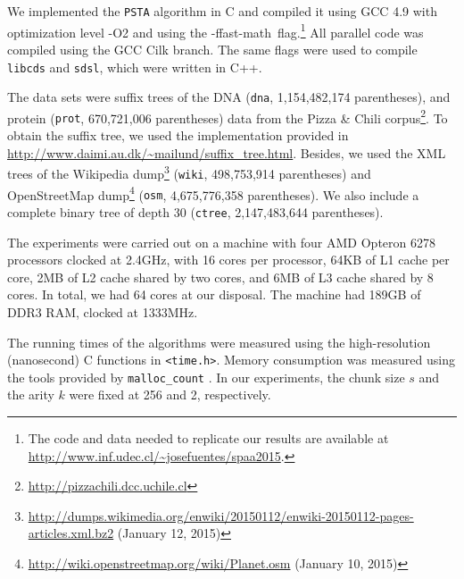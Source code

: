 We implemented the {\tt PSTA} algorithm in C and compiled it using GCC 4.9 with
optimization level -O2 and using the \mbox{-ffast-math flag}.\footnote{The code
  and data needed to replicate our results are available at
  \url{http://www.inf.udec.cl/~josefuentes/spaa2015}.}
All parallel code was compiled using the GCC Cilk branch.
The same flags were used to compile {\tt libcds} and {\tt sdsl}, which were
written in C++.

The data sets were suffix trees of the DNA ({\tt dna}, 1,154,482,174 parentheses), and
protein ({\tt prot}, 670,721,006 parentheses) data from the Pizza \& Chili
corpus\footnote{\url{http://pizzachili.dcc.uchile.cl}}. To obtain the suffix tree,
we used the implementation provided in \url{http://www.daimi.au.dk/~mailund/suffix_tree.html}.
Besides, we used the XML trees of the Wikipedia dump\footnote{\url{http://dumps.wikimedia.org/enwiki/20150112/enwiki-20150112-pages-articles.xml.bz2} (January 12, 2015)} ({\tt wiki}, 498,753,914 parentheses) and OpenStreetMap dump\footnote{\url{http://wiki.openstreetmap.org/wiki/Planet.osm} (January 10, 2015)} ({\tt osm}, 4,675,776,358 parentheses). We also include a complete binary tree of depth 30 ({\tt ctree}, 2,147,483,644 parentheses).

The experiments were carried out on a machine with four AMD
Opteron\texttrademark{} 6278 processors clocked at 2.4GHz,
with 16 cores per processor, 64KB of L1 cache per core, 2MB of L2 cache shared by two cores,
and 6MB of L3 cache shared by 8 cores.
In total, we had 64 cores at our disposal.
The machine had 189GB of DDR3 RAM, clocked at 1333MHz.

The running times of the algorithms were measured using
the high-resolution (nanosecond) C functions in {\tt <time.h>}.
Memory consumption was measured using the tools provided by
{\tt malloc\_count} \cite{malloc-count}. In our experiments, the
chunk size $s$ and the arity $k$ were fixed at 256 and 2, respectively.
